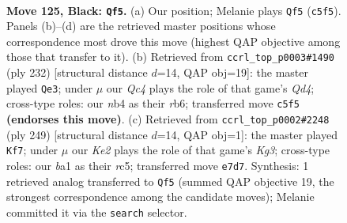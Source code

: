 \documentclass[11pt]{article}
\begin{document}
\clearpage

\begin{figure}[p]\centering
\begin{subfigure}{0.46\textwidth}\centering
\resizebox{\linewidth}{!}{%
\newchessgame
\chessboard[
  setfen={8/4k3/8/2q5/1N6/1K6/8/B7 b - - 19 125},
  showmover=false,
  pgfstyle=straightmove, color=movearrow, markmove={c5-f5}
]}
\caption{}
\end{subfigure}\hfill
\begin{subfigure}{0.46\textwidth}\centering
\resizebox{\linewidth}{!}{%
\newchessgame
\chessboard[
  setfen={8/3K4/1r6/1k6/3Q4/8/8/8 w - - 9 117},
  showmover=false,
  pgfstyle=straightmove, color=movearrow, markmove={d4-e3}
]}
\caption{}
\end{subfigure}
\\[4pt]
\begin{subfigure}{0.46\textwidth}\centering
\resizebox{\linewidth}{!}{%
\newchessgame
\chessboard[
  setfen={4N2q/1K6/6k1/2R5/8/3B4/8/8 b - - 48 125},
  showmover=false,
  pgfstyle=straightmove, color=movearrow, markmove={g6-f7}
]}
\caption{}
\end{subfigure}\hfill

\caption{\textbf{Move 125, Black: \texttt{Qf5}.} (a) Our position; Melanie plays \texttt{Qf5} (\texttt{c5f5}). Panels (b)--(d) are the retrieved master positions whose correspondence most drove this move (highest QAP objective among those that transfer to it). (b) Retrieved from \texttt{ccrl\_top\_p0003\#1490} (ply 232) [structural distance $d$=14, QAP obj=19]: the master played \texttt{Qe3}; under $\mu$ our \emph{Qc4} plays the role of that game's \emph{Qd4}; cross-type roles: our \emph{n}b4 as their \emph{r}b6; transferred move \texttt{c5f5} \textbf{(endorses this move)}. (c) Retrieved from \texttt{ccrl\_top\_p0002\#2248} (ply 249) [structural distance $d$=14, QAP obj=1]: the master played \texttt{Kf7}; under $\mu$ our \emph{Ke2} plays the role of that game's \emph{Kg3}; cross-type roles: our \emph{b}a1 as their \emph{r}c5; transferred move \texttt{e7d7}. Synthesis: 1 retrieved analog transferred to \texttt{Qf5} (summed QAP objective 19, the strongest correspondence among the candidate moves); Melanie committed it via the \texttt{search} selector.}
\label{fig:thought-m249}
\end{figure}
\end{document}
